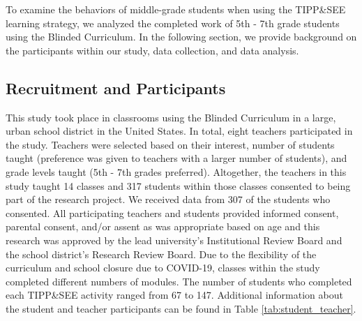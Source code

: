 \documentclass[sigconf,manuscript,review,anonymous]{acmart} %
\def\ts{TIPP\&SEE}
\newcommand{\Scratchencore}[0]{Blinded Curriculum}
\begin{document}
To examine the behaviors of middle-grade students when using the \ts{} learning strategy, we analyzed the completed work of 5th - 7th grade students using the \Scratchencore{}. In the following section, we provide background on the participants within our study, data collection, and data analysis.

\subsection{Recruitment and Participants}
This study took place in classrooms using the \Scratchencore{} in a large, urban school district in the United States. In total, eight teachers participated in the study. Teachers were selected based on their interest, number of students taught (preference was given to teachers with a larger number of students), and grade levels taught (5th - 7th grades preferred). Altogether, the teachers in this study taught 14 classes and 317 students within those classes consented to being part of the research project. We received data from 307 of the students who consented. All participating teachers and students provided informed consent, parental consent, and/or assent as was appropriate based on age and this research was approved by the lead university's Institutional Review Board and the school district's Research Review Board. Due to the flexibility of the curriculum and school closure due to COVID-19, classes within the study completed different numbers of modules. The number of students who completed each \ts{} activity ranged from 67 to 147. Additional information about the student and teacher participants can be found in Table \ref{tab:student_teacher}.
\end{document}
